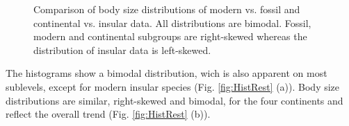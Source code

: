 \begin{center}
	\begin{figure}[htbp]
		\caption[Body size distribution comparing fossil/modern and continental/insular taxa.]{Comparison of body size distributions of modern vs. fossil and continental vs. insular data. All distributions are bimodal. Fossil, modern and continental subgroups are right-skewed whereas the distribution of insular data is left-skewed.}
		\label{fig:HistFMCI}
	\end{figure}
\end{center}

The histograms show a bimodal distribution, wich is also apparent on most sublevels, except for modern insular species (Fig. \ref{fig:HistRest} (a)).
Body size distributions are similar, right-skewed and bimodal, for the four continents and reflect the overall trend (Fig. \ref{fig:HistRest} (b)).




